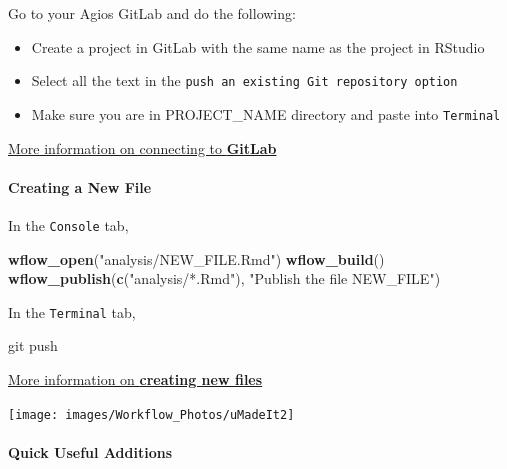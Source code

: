 \documentclass[openany]{article}
\newenvironment{Shaded}{\begin{snugshade}}{\end{snugshade}}
\newcommand{\KeywordTok}[1]{\textcolor[rgb]{0.13,0.29,0.53}{\textbf{#1}}}
\newcommand{\NormalTok}[1]{#1}
\newcommand{\StringTok}[1]{\textcolor[rgb]{0.31,0.60,0.02}{#1}}
\providecommand{\tightlist}{%
  \setlength{\itemsep}{0pt}\setlength{\parskip}{0pt}}
\let\oldparagraph\paragraph
\renewcommand{\paragraph}[1]{\oldparagraph{#1}\mbox{}}
\begin{document}
Go to your Agios GitLab and do the following:

\begin{itemize}
\tightlist
\item
  Create a project in GitLab with the same name as the project in RStudio
\item
  Select all the text in the \texttt{push\ an\ existing\ Git\ repository\ option}
\item
  Make sure you are in PROJECT\_NAME directory and paste into \texttt{Terminal}
\end{itemize}

\protect\hyperlink{connecting-to-gitlab-1}{More information on connecting to \textbf{GitLab}}

\hypertarget{creating-a-new-file}{%
\paragraph{Creating a New File}\label{creating-a-new-file}}

In the \texttt{Console} tab,

\begin{Shaded}
\begin{Highlighting}[]
\KeywordTok{wflow_open}\NormalTok{(}\StringTok{"analysis/NEW_FILE.Rmd"}\NormalTok{)}
\KeywordTok{wflow_build}\NormalTok{()}
\KeywordTok{wflow_publish}\NormalTok{(}\KeywordTok{c}\NormalTok{(}\StringTok{"analysis/*.Rmd"}\NormalTok{), }\StringTok{"Publish the file NEW_FILE"}\NormalTok{)}
\end{Highlighting}
\end{Shaded}

In the \texttt{Terminal} tab,

\begin{Shaded}
\begin{Highlighting}[]
\NormalTok{git push}
\end{Highlighting}
\end{Shaded}

\protect\hyperlink{adding-new-files}{More information on \textbf{creating new files}}

\begin{center}\texttt{[image: images/Workflow\_Photos/uMadeIt2]} \end{center}

\hypertarget{quick-useful-additions}{%
\paragraph{Quick Useful Additions}\label{quick-useful-additions}}
\end{document}
